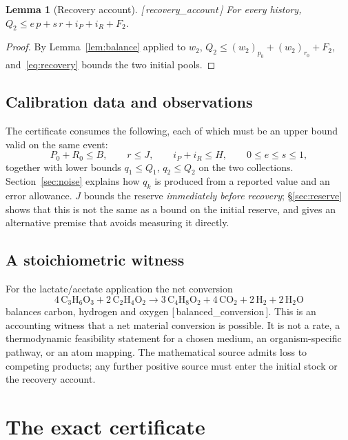 \documentclass[11pt]{article}
\theoremstyle{plain}
\newtheorem{lemma}[theorem]{Lemma}
\theoremstyle{definition}
\theoremstyle{remark}
\newcommand{\leanref}[1]{{\normalfont\sffamily\footnotesize[\,#1\,]}}
\begin{document}
\begin{lemma}[Recovery account]\label{lem:recov}
\leanref{recovery\_account}
For every history,
$Q_2\le e\,p+s\,r+i_P+i_R+F_2$.
\end{lemma}

\begin{proof}
By Lemma~\ref{lem:balance} applied to $w_2$,
$Q_2\le (w_2)_{p_0}+(w_2)_{r_0}+F_2$, and~\eqref{eq:recovery} bounds the two
initial pools.
\end{proof}

\subsection{Calibration data and observations}

The certificate consumes the following, each of which must be an upper bound
valid on the same event:
\[
 P_0+R_0\le B,\qquad
 r\le J,\qquad
 i_P+i_R\le H,\qquad
 0\le e\le s\le 1,
\]
together with lower bounds $q_1\le Q_1$, $q_2\le Q_2$ on the two collections.
Section~\ref{sec:noise} explains how $q_k$ is produced from a reported value
and an error allowance. $J$ bounds the reserve \emph{immediately before
recovery}; \S\ref{sec:reserve} shows that this is not the same as a bound on
the initial reserve, and gives an alternative premise that avoids measuring it
directly.

\subsection{A stoichiometric witness}

For the lactate/acetate application the net conversion
\begin{equation}
 4\,\mathrm{C_3H_6O_3}+2\,\mathrm{C_2H_4O_2}
 \longrightarrow
 3\,\mathrm{C_4H_8O_2}+4\,\mathrm{CO_2}+2\,\mathrm{H_2}+2\,\mathrm{H_2O}
 \label{eq:chem}
\end{equation}
balances carbon, hydrogen and oxygen \leanref{balanced\_conversion}. This is
an accounting witness that a net material conversion is possible. It is not a
rate, a thermodynamic feasibility statement for a chosen medium, an
organism-specific pathway, or an atom mapping. The mathematical source admits
loss to competing products; any further positive source must enter the initial
stock or the recovery account.

\section{The exact certificate}\label{sec:certificate}
\end{document}
